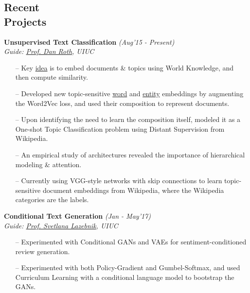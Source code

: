 \documentclass[margin,line]{templates/resume}
\newcommand{\myhref}[3][blue]{\href{#2}{\color{#1}{#3}}}
\newcommand{\compresslist}{%
\setlength{\itemsep}{3pt}%
\setlength{\parskip}{0pt}%
\setlength{\parsep}{0pt}%
}
\begin{document}
\begin{resume}
\section{\mysidestyle Recent\\ Projects}
\textsf{\textbf{Unsupervised Text Classification}} \hfill\textit{\small(Aug'15 - Present)}
\\ {\textit{Guide: \href{http://www.cis.upenn.edu/~danroth/}{Prof. Dan Roth}, UIUC}} \hfill{\myhref[darkblue]{https://shatu.github.io/\#dataless}{Web}}
\vspace{0.05cm}
\normalsize
\vspace{0.05cm}
\begin{itemize}[leftmargin=0.7cm]\compresslist
    \item[--] Key \href{https://cogcomp.org/page/project_view/6}{idea} is to embed documents \& topics using World Knowledge, and then compute similarity.
    \item[--] Developed new topic-sensitive \href{https://shatu.github.io/\#topic-emb}{word} and \href{https://shatu.github.io/\#entity-emb}{entity} embeddings by augmenting the Word2Vec loss, and used their composition to represent documents.
    \item[--] Upon identifying the need to learn the composition itself, modeled it as a One-shot Topic Classification problem using Distant Supervision from Wikipedia.
    \item[--] An empirical study of architectures revealed the importance of hierarchical modeling \& attention.
    \item[--] Currently using VGG-style networks with skip connections to learn topic-sensitive document embeddings from Wikipedia, where the Wikipedia categories are the labels.
\vspace{0.05cm}
    
\end{itemize}

\vspace{-0.1cm}    
\textsf{\textbf{Conditional Text Generation}} \hfill\textit{\small(Jan - May'17)}
\\ {\textit{Guide: \href{http://slazebni.cs.illinois.edu/}{Prof. Svetlana Lazebnik}, UIUC}} \hfill{\myhref[darkblue]{https://shatu.github.io/\#textGen}{Web}}
\vspace{0.05cm}
\begin{itemize}[leftmargin=*]\compresslist
\item[--]Experimented with Conditional GANs and VAEs for sentiment-conditioned review generation. \item[--]Experimented with both Policy-Gradient and Gumbel-Softmax, and used Curriculum Learning with a conditional language model to bootstrap the GANs.
\end{itemize}


\end{resume}
\end{document}
